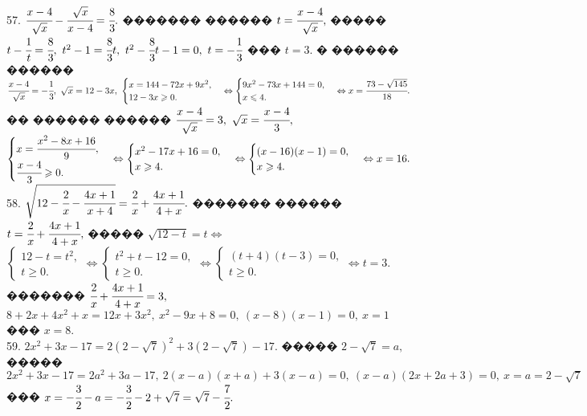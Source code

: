 \documentclass[12pt]{article}
\begin{document}
57. $\cfrac{x-4}{\sqrt{x}}-\cfrac{\sqrt{x}}{x-4}=\cfrac{8}{3}.$ ������� ������ $t=\cfrac{x-4}{\sqrt{x}},$ ����� $t-\cfrac{1}{t}=\cfrac{8}{3},\ t^2-1=\cfrac{8}{3}t,\
 t^2-\cfrac{8}{3}t-1=0,\ t=-\cfrac{1}{3}$ ��� $t=3.$ � ������ ������ $\cfrac{x-4}{\sqrt{x}}=-\cfrac{1}{3},\ \sqrt{x}=12-3x,\ \begin{cases} x=144-72x+9x^2,\\ 12-3x\geqslant0.\end{cases}\Leftrightarrow\begin{cases} 9x^2-73x+144=0,\\ x\leqslant4.\end{cases}\Leftrightarrow x=\cfrac{73-\sqrt{145}}{18}.$ �� ������ ������ $
\cfrac{x-4}{\sqrt{x}}=3,\ \sqrt{x}=\cfrac{x-4}{3},$\\$ \begin{cases} x=\cfrac{x^2-8x+16}{9},\\ \cfrac{x-4}{3}\geqslant0.\end{cases}\Leftrightarrow
\begin{cases} x^2-17x+16=0,\\ x\geqslant4.\end{cases}\Leftrightarrow\begin{cases} (x-16)(x-1)=0,\\ x\geqslant4.\end{cases}\Leftrightarrow x=16.$\\
58. $\sqrt{12-\cfrac{2}{x}-\cfrac{4x+1}{x+4}}=\cfrac{2}{x}+\cfrac{4x+1}{4+x}.$ ������� ������ $t=\cfrac{2}{x}+\cfrac{4x+1}{4+x},$ ����� $\sqrt{12-t}=t\Leftrightarrow$\\$ \begin{cases} 12-t=t^2,\\ t\geqslant0.\end{cases}\Leftrightarrow \begin{cases} t^2+t-12=0,\\ t\geqslant0.\end{cases}
\Leftrightarrow \begin{cases} (t+4)(t-3)=0,\\ t\geqslant0.\end{cases}\Leftrightarrow t=3.$ ������� $\cfrac{2}{x}+\cfrac{4x+1}{4+x}=3,$\\$
8+2x+4x^2+x=12x+3x^2,\ x^2-9x+8=0,\ (x-8)(x-1)=0,\ x=1$ ��� $x=8.$\\
59. $2x^2+3x-17=2(2-\sqrt{7})^2+3(2-\sqrt{7})-17.$ ����� $2-\sqrt{7}=a,$ ����� $2x^2+3x-17=2a^2+3a-17,\ 2(x-a)(x+a)+3(x-a)=0,\ (x-a)(2x+2a+3)=0,\ x=a=2-\sqrt{7}$ ��� $x=-\cfrac{3}{2}-a=-\cfrac{3}{2}-2+\sqrt{7}=\sqrt{7}-\cfrac{7}{2}.$\\
\end{document}

